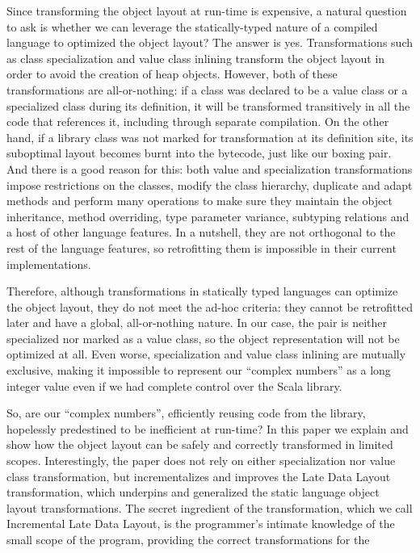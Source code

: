 Since transforming the object layout at run-time is expensive, a natural question to ask is whether we can leverage the statically-typed nature of a compiled language to optimized the object layout? The answer is yes. Transformations such as class specialization and value class inlining transform the object layout in order to avoid the creation of heap objects. However, both of these transformations are all-or-nothing: if a class was declared to be a value class or a specialized class during its definition, it will be transformed transitively in all the code that references it, including through separate compilation. On the other hand, if a library class was not marked for transformation at its definition site, its suboptimal layout becomes burnt into the bytecode, just like our boxing pair. And there is a good reason for this: both value and specialization transformations impose restrictions on the classes, modify the class hierarchy, duplicate and adapt methods and perform many operations to make sure they maintain the object inheritance, method overriding, type parameter variance, subtyping relations and a host of other language features. In a nutshell, they are not orthogonal to the rest of the language features, so retrofitting them is impossible in their current implementations.

Therefore, although transformations in statically typed languages can optimize the object layout, they do not meet the ad-hoc criteria: they cannot be retrofitted later and have a global, all-or-nothing nature. In our case, the pair is neither specialized nor marked as a value class, so the object representation will not be optimized at all. Even worse, specialization and value class inlining are mutually exclusive, making it impossible to represent our ``complex numbers'' as a long integer value even if we had complete control over the Scala library.

So, are our ``complex numbers'', efficiently reusing code from the library, hopelessly predestined to be inefficient at run-time? In this paper we explain and show how the object layout can be safely and correctly transformed in limited scopes. Interestingly, the paper does not rely on either specialization nor value class transformation, but incrementalizes and improves the Late Data Layout transformation, which underpins and generalized the static language object layout transformations. The secret ingredient of the transformation, which we call Incremental Late Data Layout, is the programmer's intimate knowledge of the small scope of the program, providing the correct transformations for the

